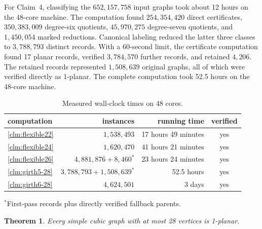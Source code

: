\documentclass[a4paper,11pt]{article}
\theoremstyle{plain}
\newtheorem{theorem}{Theorem}
\theoremstyle{definition}  %
\begin{document}
For Claim~4, classifying the $652{,}157{,}758$ input graphs took about 12 hours
on the 48-core machine.  The computation found $254{,}354{,}420$ direct
certificates, $350{,}383{,}009$ degree-six quotients, $45{,}970{,}275$
degree-seven quotients, and $1{,}450{,}054$ marked reductions.  Canonical
labeling reduced the latter three classes to $3{,}788{,}793$ distinct records.
With a 60-second limit, the certificate computation found 17 planar records,
verified $3{,}784{,}570$ further records, and retained $4{,}206$.  The retained
records represented $1{,}508{,}639$ original graphs, all of which were verified
directly as 1-planar.  The complete computation took 52.5 hours on the
48-core machine.

\begin{table}[!ht]
    \small
    \centering
    \caption{Measured wall-clock times on 48 cores.}
    \label{tab:cubic28-runtime}
    \begin{tabular}{@{}lrrc@{}}
        \toprule
        computation & instances & running time & verified \\
        \midrule
        \cref{clm:flexible22} & $1{,}538{,}493$ & 17 hours 49 minutes & yes \\
        \cref{clm:flexible24} & $1{,}620{,}470$ & 41 hours 21 minutes & yes \\
        \cref{clm:flexible26} & $4{,}881{,}876+8{,}460^\ast$ & 23 hours 24 minutes & yes \\
        \cref{clm:girth5-28}  & $3{,}788{,}793+1{,}508{,}639^\ast$ & 52.5 hours & yes \\
        \cref{clm:girth6-28}  & $4{,}624{,}501$ & 3 days & yes \\
        \bottomrule
    \end{tabular}
    \par\smallskip
    {\footnotesize $^\ast$First-pass records plus directly verified fallback parents.\par}
\end{table}

\begin{theorem}\label{thm:cubic28}
    Every simple cubic graph with at most 28 vertices is 1-planar.
\end{theorem}
\end{document}
